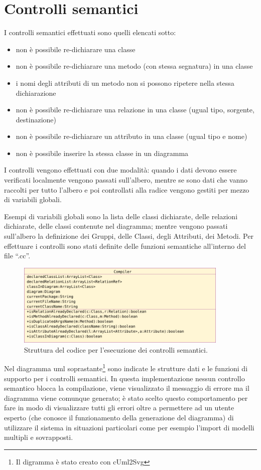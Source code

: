 \section{Controlli semantici}


I controlli semantici effettuati sono quelli elencati sotto:
\begin{itemize}
   \item non è possibile re-dichiarare una classe
   \item non è possibile re-dichiarare una metodo (con stessa segnatura) in una
   classe
   \item i nomi degli attributi di un metodo non si possono ripetere nella stessa dichiarazione
   \item non è possibile re-dichiarare una relazione in una classe (ugual tipo,
   sorgente, destinazione)
   \item non è possibile re-dichiarare un attributo in una classe (ugual tipo e
   nome)
   \item non è possibile inserire la stessa classe in un diagramma 
\end{itemize}


I controlli vengono effettuati con due modalità: quando i dati devono essere
verificati localmente vengono passati sull'albero, mentre se sono dati che vanno
raccolti per tutto l'albero e poi controllati alla radice vengono gestiti per
mezzo di variabili globali.

Esempi di variabili globali sono la lista delle classi dichiarate, delle
relazioni dichiarate, delle classi contenute nel diagramma; mentre vengono passati
sull'albero la
definizione dei Gruppi, delle Classi, degli Attributi, dei Metodi.
Per effettuare i controlli sono stati definite delle funzioni semantiche
all'interno del file ``.cc''.

\begin{figure}[htp]
\begin{center}
  \includegraphics[width=0.9\textwidth]{img/uml_compilatore}
  \caption[labelInTOC]{Struttura del codice per l'esecuzione dei controlli semantici.}
\end{center}
\end{figure}

Nel diagramma uml soprastante\footnote{Il digramma è stato creato con cUml2Svg} sono
indicate le strutture dati e le funzioni di supporto per i controlli semantici.
In questa implementazione nessun controllo semantico blocca la compilazione,
viene visualizzato il messaggio di errore ma il diagramma viene comunque
generato; è stato scelto questo comportamento per fare in modo di visualizzare
tutti gli errori oltre a permettere ad un utente esperto (che conosce il
funzionamento della generazione del diagramma) di utilizzare il sistema in
situazioni particolari come per esempio l'import di modelli multipli e sovrapposti.
